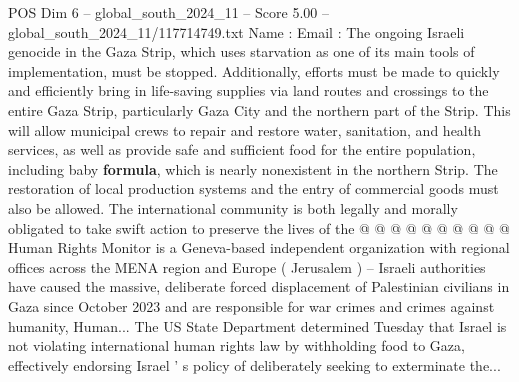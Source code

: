 \begin{textsample}{POS Dim 6 – global\_south\_2024\_11 – Score 5.00 – global\_south\_2024\_11/117714749.txt}
Name : Email : The ongoing Israeli genocide in the Gaza Strip, which uses starvation as one of its main tools of implementation, must be stopped.
Additionally, efforts must be made to quickly and efficiently bring in life-saving supplies via land routes and crossings to the entire Gaza Strip, particularly Gaza City and the northern part of the Strip.
This will allow municipal crews to repair and restore water, sanitation, and health services, as well as provide safe and sufficient food for the entire population, including baby \textbf{formula}, which is nearly nonexistent in the northern Strip.
The restoration of local production systems and the entry of commercial goods must also be allowed.
The international community is both legally and morally obligated to take swift action to preserve the lives of the @ @ @ @ @ @ @ @ @ @ Human Rights Monitor is a Geneva-based independent organization with regional offices across the MENA region and Europe ( Jerusalem ) -- Israeli authorities have caused the massive, deliberate forced displacement of Palestinian civilians in Gaza since October 2023 and are responsible for war crimes and crimes against humanity, Human...
The US State Department determined Tuesday that Israel is not violating international human rights law by withholding food to Gaza, effectively endorsing Israel ' s policy of deliberately seeking to exterminate the...

\end{textsample}

